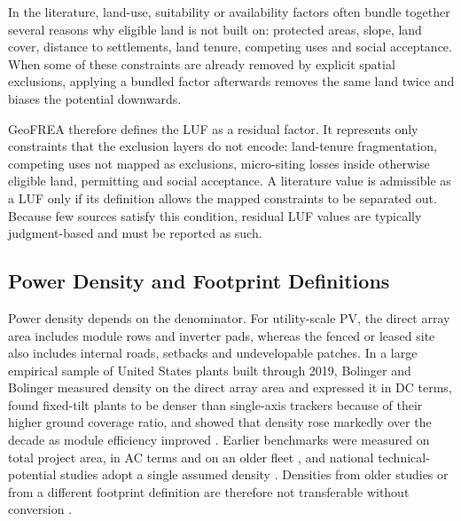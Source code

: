 In the literature, land-use, suitability or availability factors often
bundle together several reasons why eligible land is not built on:
protected areas, slope, land cover, distance to settlements, land tenure,
competing uses and social acceptance. When some of these constraints are
already removed by explicit spatial exclusions, applying a bundled
factor afterwards removes the same land twice and biases the potential
downwards.

GeoFREA therefore defines the LUF as a residual factor. It represents
only constraints that the exclusion layers do not encode: land-tenure
fragmentation, competing uses not mapped as exclusions, micro-siting
losses inside otherwise eligible land, permitting and social acceptance.
A literature value is admissible as a LUF only if its definition allows
the mapped constraints to be separated out. Because few sources satisfy
this condition, residual LUF values are typically judgment-based and
must be reported as such.

\subsection{Power Density and Footprint Definitions}
\label{subsec:power_density_theory}

Power density depends on the denominator. For utility-scale PV, the
direct array area includes module rows and inverter pads, whereas the
fenced or leased site also includes internal roads, setbacks and
undevelopable patches. In a large empirical sample of United States
plants built through 2019, Bolinger and Bolinger measured density on the
direct array area and expressed it in DC terms, found fixed-tilt plants
to be denser than single-axis trackers because of their higher ground
coverage ratio, and showed that density rose markedly over the decade as
module efficiency improved \cite{bolinger2022}. Earlier benchmarks were
measured on total project area, in AC terms and on an older fleet
\cite{ong2013}, and national technical-potential studies adopt a single
assumed density \cite{lopez2012}. Densities from older studies or from a
different footprint definition are therefore not transferable without
conversion \cite{turkovska2024}.

